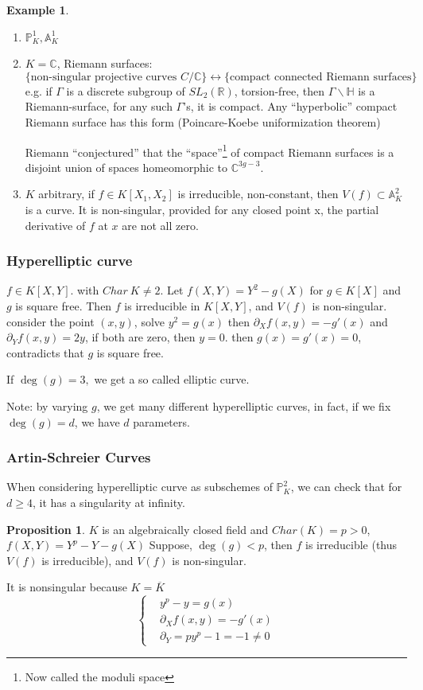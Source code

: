 \documentclass[11pt]{article}
\theoremstyle{definition}
\newtheorem{prop}[thm]{Proposition}
\newtheorem{ex}[thm]{Example}
\newcommand{\affn}{\mathbb A}
\newcommand{\proj}{\mathbb P}
\newcommand{\reals}{\mathbb R}
\newcommand{\cplx}{\mathbb C}
\newcommand{\pd}{\partial}
\newcommand{\llrta}{\longleftrightarrow}
\begin{document}
\begin{ex}\ 
\begin{enumerate}[label=(\arabic*)]
\item $\proj^1_K,\affn^1_K$
\item $K=\cplx$, Riemann surfaces: 
$$
\{\text{non-singular projective curves } C/\cplx \}\llrta\{\text{compact connected Riemann surfaces}\}
$$
e.g. if $\Gamma$ is a discrete subgroup of $SL_2(\reals)$, torsion-free, then $\Gamma\backslash \mathbb{H}$ is a Riemann-surface, for any such $\Gamma$'s, it is compact. Any ``hyperbolic'' compact Riemann surface has this form (Poincare-Koebe uniformization theorem)

Riemann ``conjectured'' that the ``space''\footnote{Now called the moduli space} of compact Riemann surfaces is a disjoint union of spaces homeomorphic to $\cplx^{3g-3}$.
\item $K$ arbitrary, if $f\in K[X_1,X_2]$ is irreducible, non-constant, then $V(f)\subset \affn^2_K$ is a curve. It is non-singular, provided for any closed point x, the partial derivative of $f$ at $x$ are not all zero.
\end{enumerate}
\end{ex}
\subsubsection{Hyperelliptic curve} $f\in K[X,Y]$. with $Char\ K\neq 2$. Let $f(X,Y)=Y^2-g(X)$ for $g\in K[X]$ and $g$ is square free. Then $f$ is  irreducible in $K[X,Y]$, and $V(f)$ is non-singular. consider the point $(x,y)$, solve $y^2=g(x)$ then $\pd_X f(x,y)=-g'(x)$ and $\pd_Y f(x,y)=2y$, if both are zero, then $y=0$. then $g(x)=g'(x)=0$, contradicts that $g$
is square free.

If $\deg(g)=3,$ we get a so called elliptic curve.

Note: by varying $g$, we get many different hyperelliptic curves, in fact, if we fix $\deg(g)=d$, we have $d$ parameters. 
\subsubsection{Artin-Schreier Curves}

When considering hyperelliptic curve as subschemes of $\proj^2_K$, we can check that for $d\geq 4$, it has a singularity at infinity. 
\begin{prop}
$K$ is an algebraically closed field and
$Char(K)=p> 0$, $f(X,Y)=Y^p-Y-g(X)$
Suppose, $\deg(g)< p$, then $f$ is irreducible (thus $V(f)$ is irreducible), and $V(f)$ is non-singular.
\end{prop}
It is nonsingular  because $K=\overline{K}$
$$
\left\{
\begin{aligned}
& y^p-y=g(x)\\
& \pd_Xf(x,y)=-g'(x)\\
& \pd_Y= p y^p-1=-1\neq 0
\end{aligned}
\right.
$$
\end{document}
